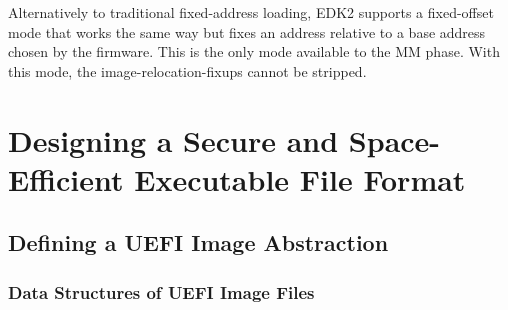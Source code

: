 Alternatively to traditional fixed-address loading, \gls{EDK2} supports a fixed-offset mode that works the same way but fixes an address relative to a base address chosen by the \gls{firmware}. This is the only mode available to the \gls{MM} phase. With this mode, the \glspl{image-relocation-fixup} cannot be stripped.

\chapter{Designing a Secure and Space-Efficient Executable File Format} %
\label{chap:uefi_exec_design}

\section{Defining a UEFI Image Abstraction}

\subsection{Data Structures of UEFI Image Files}

